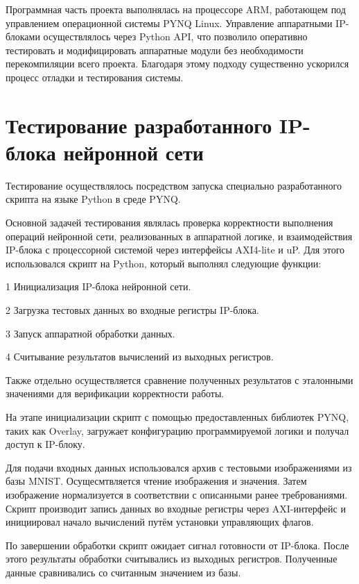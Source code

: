 Программная часть проекта выполнялась на процессоре ARM, работающем под 
управлением операционной системы PYNQ Linux. Управление аппаратными IP-блоками 
осуществлялось через Python API, что позволило оперативно тестировать и 
модифицировать аппаратные модули без необходимости перекомпиляции всего 
проекта. Благодаря этому подходу существенно ускорился процесс отладки и 
тестирования системы.

\section{Тестирование разработанного IP-блока нейронной сети}\par
\hspace*{12.5 mm}Тестирование осуществлялось посредством запуска специально 
разработанного скрипта на языке Python в среде PYNQ.

Основной задачей тестирования являлась проверка корректности выполнения 
операций нейронной сети, реализованных в аппаратной логике, и 
взаимодействия IP-блока с процессорной системой через интерфейсы AXI4-lite и uP. 
Для этого использовался скрипт на Python, который выполнял следующие функции: 

    1 Инициализация IP-блока нейронной сети. 

    2 Загрузка тестовых данных во входные регистры IP-блока. 
    
    3 Запуск аппаратной обработки данных. 
    
    4 Считывание результатов вычислений из выходных регистров. 
    
Также отдельно осуществляется сравнение полученных результатов с эталонными 
значениями для верификации корректности работы. 

На этапе инициализации скрипт с помощью предоставленных библиотек PYNQ, таких 
как {Overlay}, загружает конфигурацию программируемой логики и получал доступ 
к IP-блоку.

Для подачи входных данных использовался архив с тестовыми изображениями из 
базы MNIST. Осущесмтвляется чтение изображения и значения. Затем изображение
нормализуется в соответствии с описанными ранее треброваниями. Скрипт 
производит запись данных во входные регистры через AXI-интерфейс и
инициировал начало вычислений путём установки управляющих флагов.

По завершении обработки скрипт ожидает сигнал готовности от IP-блока. После 
этого результаты обработки считывались из выходных регистров. Полученные данные 
сравнивались со считанным значением из базы.

